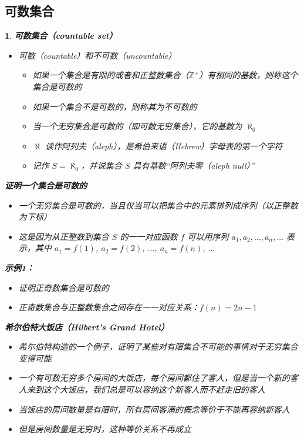 \documentclass[UTF8]{report}
\theoremstyle{MyLineTheoremStyle} %
\theoremstyle{MyBlockTheoremStyle} %
\theoremstyle{MySubsubsectionStyle} %
\newtheorem{definition}{}
\begin{document}
\subsection{可数集合}

\begin{definition}
    \textbf{可数集合（countable set）}\par
    \begin{itemize}
        \item 可数（countable）和不可数（uncountable）
        \begin{itemize}
            \item 如果一个集合是有限的或者和正整数集合（$\mathbb{Z}^+$）有相同的基数，则称这个集合是可数的
            \item 如果一个集合不是可数的，则称其为不可数的
            \item 当一个无穷集合是可数的（即可数无穷集合），它的基数为 $\aleph_0$
            \item $\aleph$ 读作阿列夫（aleph），是希伯来语（Hebrew）字母表的第一个字符
            \item 记作 $S = \aleph_0$，并说集合 $S$ 具有基数“阿列夫零（aleph null）”
        \end{itemize}
    \end{itemize}

    \textbf{证明一个集合是可数的}\par
    \begin{itemize}
        \item 一个无穷集合是可数的，当且仅当可以把集合中的元素排列成序列（以正整数为下标）
        \item 这是因为从正整数到集合 $S$ 的一一对应函数 $f$ 可以用序列 $a_1, a_2, \ldots, a_n, \ldots$ 表示，其中 $a_1 = f(1)$, $a_2 = f(2)$, $\ldots$, $a_n = f(n)$, $\ldots$
    \end{itemize}

    \textbf{示例1：}\par
    \begin{itemize}
        \item 证明正奇数集合是可数的
        \item 正奇数集合与正整数集合之间存在一一对应关系：$f(n) = 2n - 1$
    \end{itemize}

    \textbf{希尔伯特大饭店（Hilbert’s Grand Hotel）}\par
    \begin{itemize}
        \item 希尔伯特构造的一个例子，证明了某些对有限集合不可能的事情对于无穷集合变得可能
        \item 一个有可数无穷多个房间的大饭店，每个房间都住了客人，但是当一个新的客人来到这个大饭店，我们总是可以容纳这个新客人而不赶走旧的客人
        \item 当饭店的房间数量是有限时，所有房间客满的概念等价于不能再容纳新客人
        \item 但是房间数量是无穷时，这种等价关系不再成立
    \end{itemize}


\end{definition}
\end{document}
